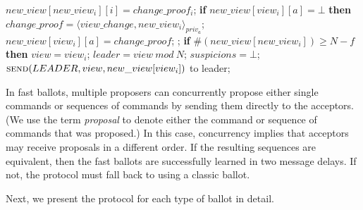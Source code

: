 \begin{algorithm}
\begin{multicols}{2}
\begin{algorithmic}[1]
			\State
			\State \hspace{\algorithmicindent} $new\_view[new\_view_i][i] = change\_proof_i$;
			\State \hspace{\algorithmicindent} \textbf{if} $new\_view[view_i][a] = \bot$ \textbf{then}				
			\State \hspace{\algorithmicindent}\hspace{\algorithmicindent} $change\_proof = \langle view\_change, new\_view_i \rangle_{priv_a}$;
			\State \hspace{\algorithmicindent}\hspace{\algorithmicindent} $new\_view[view_i][a] = change\_proof$;
			\State \hspace{\algorithmicindent}\hspace{\algorithmicindent}  ;
			\State
			\State \hspace{\algorithmicindent} \textbf{if} $\#(new\_view[new\_view_i]) \geq N-f$ \textbf{then}
			\State \hspace{\algorithmicindent}\hspace{\algorithmicindent} $view = view_i$;
			\State \hspace{\algorithmicindent}\hspace{\algorithmicindent} $leader = view\ mod\ N$;
			\State \hspace{\algorithmicindent}\hspace{\algorithmicindent} $suspicions = \bot$;
			\State \hspace{\algorithmicindent}\hspace{\algorithmicindent} $\Call{send}{LEADER, view, new\_view[view_i]}$ to leader;
		\end{algorithmic}
	\end{multicols}
	\vspace*{-.4cm}
\end{algorithm}

In fast ballots, multiple proposers can concurrently propose either single commands or sequences of commands by sending them directly to the acceptors. (We use the term \textit{proposal} to denote either the command or sequence of commands that was proposed.) In this case, concurrency implies that acceptors may receive proposals in a different order. If the resulting sequences are equivalent, then the fast ballots are successfully learned in two message delays. If not, the protocol must fall back to using a classic ballot.\par
Next, we present the protocol for each type of ballot in detail.

